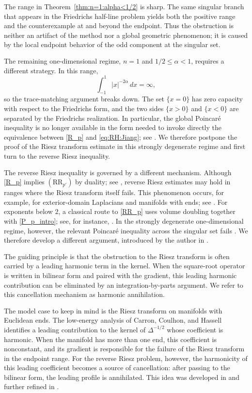 \documentclass[12pt]{amsart}
\begin{document}
The range in Theorem~\ref{thm:n=1:alpha<1/2} is sharp. The same singular
branch that appears in the Friedrichs half-line problem yields both the
positive range and the counterexample at and beyond the endpoint. Thus the
obstruction is neither an artifact of the method nor a global geometric
phenomenon; it is caused by the local endpoint behavior of the odd component
at the singular set.

The remaining one-dimensional regime, $n=1$ and $1/2\leq\alpha<1$, requires
a different strategy. In this range,
\begin{equation*}
    \int_{-1}^1|x|^{-2\alpha}\,dx=\infty,
\end{equation*}
so the trace-matching argument breaks down. The set $\{x=0\}$ has zero
capacity with respect to the Friedrichs form, and the two sides
$\{x>0\}$ and $\{x<0\}$ are separated by the Friedrichs realization. In
particular, the global Poincar\'e inequality is no longer available in the
form needed to invoke directly the equivalence between \eqref{R_p} and
\eqref{eq:RH:Jiang}; see \cite{RS2}. We therefore postpone the proof of the
Riesz transform estimate in this strongly degenerate regime and first turn
to the reverse Riesz inequality.

The reverse Riesz inequality is governed by a different mechanism. Although
\eqref{R_p} implies $(\mathrm{RR}_{p'})$ by duality; see \cite{CD},
reverse Riesz estimates may hold in ranges where the Riesz transform itself
fails. This phenomenon occurs, for example, for exterior-domain Laplacians
and manifolds with ends; see \cite{KVZ,JL,H2}. For exponents below $2$, a
classical route to \eqref{RR_p} uses volume doubling together with \eqref{P_p_intro}; see, for instance, \cite{AC}. In the strongly
degenerate one-dimensional regime, however, the relevant Poincar\'e
inequality across the singular set fails \cite{RS2}. We therefore develop a different argument, introduced by the author in \cite{H2}.

The guiding principle is that the obstruction to the Riesz transform is
often carried by a leading harmonic term in the kernel. When the square-root
operator is written in bilinear form and paired with the gradient, this
leading harmonic contribution can be eliminated by an integration-by-parts
argument. We refer to this cancellation mechanism as harmonic annihilation.

The model case to keep in mind is the Riesz transform on manifolds with Euclidean ends. The low-energy analysis of Carron, Coulhon, and Hassell \cite{CCH} identifies a leading contribution to the kernel of
$\Delta^{-1/2}$ whose coefficient is harmonic. When the manifold has more than one end, this coefficient is nonconstant, and its gradient is responsible for the failure of the Riesz transform in the endpoint range. For the reverse Riesz problem, however, the harmonicity of this leading coefficient becomes a source of cancellation: after passing to the bilinear form, the leading profile is annihilated. This idea was developed in \cite{H2} and further refined in \cite{H3}.
\end{document}
